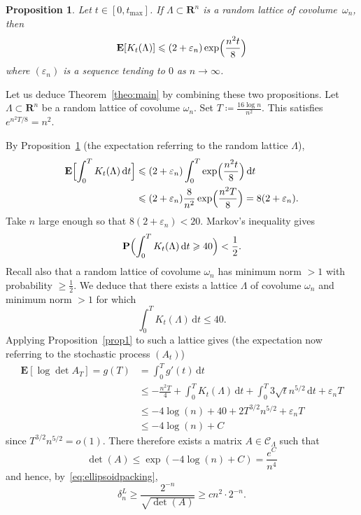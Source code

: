 \documentclass[10pt,a4paper]{amsart}
\newcommand{\R}{\mathbf{R}}
\newcommand{\E}{\mathbf{E}}
\newcommand{\e}{\varepsilon}
\renewcommand{\P}{\mathbf{P}}
\renewcommand{\leq}{\leqslant}
\renewcommand{\geq}{\geqslant}
\newtheorem{proposition}{Proposition}
\begin{document}
\begin{proposition} \label{prop2}
Let $t \in [0,t_{\max}]$. If $\Lambda \subset \R^n$ is a random lattice of covolume~$\omega_n$, then
\[ \E[K_t(\Lambda)] \leq (2+\e_n) \exp \Bigl( \frac{n^2t}{8} \Bigr) \]
where $(\e_n)$ is a sequence tending to $0$ as $n \to \infty$.
\end{proposition}
 
Let us deduce Theorem~\ref{theo:main} by combining these two propositions. Let $\Lambda \subset \R^n$ be a random lattice of covolume $\omega_n$. Set $T \coloneqq \frac{16 \log n}{n^2}$. This satisfies $e^{n^2T/8}=n^2$.
 
By Proposition~\ref{prop2} (the expectation referring to the random lattice $\Lambda$),
\begin{align*} \E \Bigl[ \int_0^T K_t(\Lambda) \, \mathrm{d} t \Bigr]
& \leq  (2+\e_n) \int_0^T \exp \Bigl( \frac{n^2t}{8} \Bigr) \, \mathrm{d}t \\
& \leq  (2+\e_n) \frac{8}{n^2} \exp  \Bigl( \frac{n^2T}{8} \Bigr) = 8(2+\e_n).
\end{align*}
Take $n$ large enough so that $8(2+\e_n) < 20$. Markov's inequality gives
\[ \P \Bigl( \int_0^T K_t(\Lambda) \, \mathrm{d}t \geq 40 \Bigr) < \frac{1}{2}. \]
Recall also that a random lattice of covolume $\omega_n$ has minimum norm $>1$ with probability $\geq \frac{1}{2}$. We deduce that there exists a lattice $\Lambda$ of covolume $\omega_n$ and minimum norm $>1$ for which
\[ \int_0^T K_t(\Lambda) \,\mathrm{d}t \leq 40 .\]
Applying Proposition~\ref{prop1} to such a lattice gives (the expectation now referring to the stochastic process $(A_t)$)
\begin{align} \nonumber \E [ \log \det A_T ] = g(T) &= \int_0^T g'(t) \, \mathrm{d}t \\
\label{eq:final} & \leq  - \frac{n^2T}{4} + \int_0^T K_t(\Lambda) \, \mathrm{d}t + \int_0^T 3 \sqrt{t} n^{5/2} \, \mathrm{d}t + \e_n T \\
\nonumber & \leq  -4 \log(n) + 40 + 2 T^{3/2} n^{5/2} + \e_n T \\\nonumber & \leq   -4 \log (n) + C
\end{align}
since $T^{3/2}n^{5/2} = o(1)$. There therefore exists a matrix $A \in \mathscr{C}_\Lambda$ such that
\[ \det(A) \leq \exp( -4 \log(n) +C ) = \frac{e^C}{n^4} \]
and hence, by~\eqref{eq:ellipsoidpacking},
\[ \delta_n^L \geq \frac{2^{-n}}{\sqrt{\det(A)}} \geq c n^2 \cdot 2^{-n}.\]
 
\end{document}
